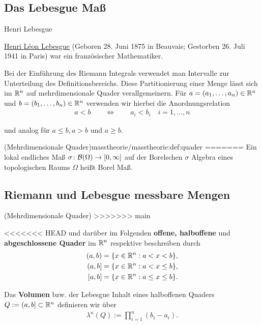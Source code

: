\subsection{Das Lebesgue Maß}
\label{\detokenize{masstheorie/masstheorie:das-lebesgue-masz}}
\begin{emphBox}{Henri Lebesgue}{}

\par
\href{https://en.wikipedia.org/wiki/Henri\_Lebesgue}{Henri Léon Lebesgue} (Geboren 28. Juni 1875 in Beauvais; Gestorben 26. Juli 1941 in Paris) war ein französischer Mathematiker.
\end{emphBox}

\par
Bei der Einführung des Riemann Integrals verwendet man Intervalle zur Unterteilung des Definitionsbereichs.
Diese Partitionierung einer Menge lässt sich im \(\mathbb{R}^n\) auf mehrdimensionale Quader verallgemeinern. Für \(a = (a_1,\ldots,a_n) \in \mathbb{R}^n\) und \(b = (b_1,\ldots,b_n) \in \mathbb{R}^n\) verwenden wir hierbei die Anordnungsrelation
\begin{align*}
a < b \qquad \Leftrightarrow \qquad a_i < b_i \quad i=1,\ldots,n
\end{align*}
\par
und analog für \(a \leq b, a > b\) und \(a \geq b\).
\begin{definition}{(Mehrdimensionale Quader)}{masstheorie/masstheorie:def:quader}
=======
Ein lokal endliches Maß \(\sigma \colon \mathcal{B}(\Omega) \rightarrow [0, \infty]\) auf der Borelschen \(\sigma\) Algebra eines topologischen Raums \(\Omega\) heißt Borel Maß.
\end{definition}


\subsection{Riemann  und Lebesgue messbare Mengen}
\begin{definition}{(Mehrdimensionale Quader)}{}\label{masstheorie/masstheorie:definition-6}
>>>>>>> main



\par
<<<<<<< HEAD
und darüber im Folgenden \textbf{offene, halboffene} und \textbf{abgeschlossene Quader} im \(\mathbb{R}^n\) respektive beschreiben durch
\begin{align*}
(a,b) &= \lbrace x \in \mathbb{R}^n : a < x < b \rbrace,\\
(a,b] &= \lbrace x \in \mathbb{R}^n : a < x \leq b \rbrace,\\
[a,b] &= \lbrace x \in \mathbb{R}^n : a \leq x \leq b \rbrace.
\end{align*}
\par
Das \textbf{Volumen} bzw. der Lebesgue Inhalt eines halboffenen Quaders \(Q := (a,b] \subset \mathbb{R}^n\) definieren wir über
\begin{align*}
\lambda^n(Q) := \prod_{i=1}^n (b_i - a_i).
\end{align*}\end{definition}

